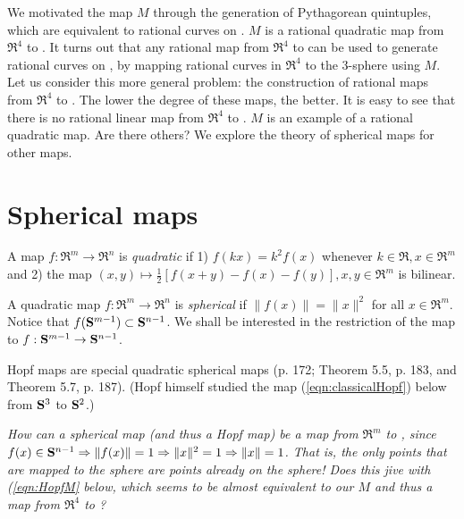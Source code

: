 We motivated the map $M$ through the generation of Pythagorean quintuples,
which are equivalent to rational curves on .
$M$ is a rational quadratic map from $\Re^4$ to .
It turns out that any rational map from $\Re^4$ to  can be used
to generate rational curves on , by mapping rational curves in $\Re^4$
to the 3-sphere using $M$.
Let us consider this more general problem: 
the construction of rational maps from $\Re^4$ to .
The lower the degree of these maps, the better.
It is easy to see that there is no rational linear map from $\Re^4$ to .
$M$ is an example of a rational quadratic map.
Are there others?
We explore the theory of spherical maps \cite{ono94} for other maps.

\section{Spherical maps}

\begin{defn2}
{\rm
A map $f:\Re^m \rightarrow \Re^n$ is {\em quadratic} if 1) $f(kx) = k^2 f(x)$
whenever $k \in \Re, x \in \Re^m$
and 2) the map $(x,y) \mapsto \frac{1}{2} [f(x+y) - f(x) - f(y)], x,y\in\Re^m$
is bilinear.
}
\end{defn2}

\begin{defn2}
{\rm
A quadratic map $f:\Re^m \rightarrow \Re^n$ is {\em spherical} 
if $\| f(x) \| = \| x \|^2$ for all $x \in \Re^m$.
Notice that $f(\mbox{{\bf S}$^{m-1}$}) \subset \mbox{{\bf S}$^{n-1}$}$.
We shall be interested in the restriction of the map to 
$f:\mbox{{\bf S}$^{m-1}$} \rightarrow \mbox{{\bf S}$^{n-1}$}$.
}
\end{defn2}

Hopf maps are special quadratic spherical maps (p. 172; Theorem 5.5, p. 183, and Theorem 5.7, p. 187).
(Hopf himself studied the map (\ref{eqn:classicalHopf}) below from $\mbox{{\bf S}$^{3}$}$ to $\mbox{{\bf S}$^{2}$}$.)

{\em How can a spherical map (and thus a Hopf map) 
be a map from $\Re^{m}$ to ,
since $f(x) \in \mbox{{\bf S}$^{n-1}$} \Rightarrow \| f(x) \| = 1 \Rightarrow \|x\|^2 = 1
\Rightarrow \|x\| = 1$.
That is, the only points that are mapped to the sphere are points already
on the sphere!
Does this jive with (\ref{eqn:HopfM} below, which seems to be almost equivalent
to our $M$ and thus a map from $\Re^4$ to ?
}


